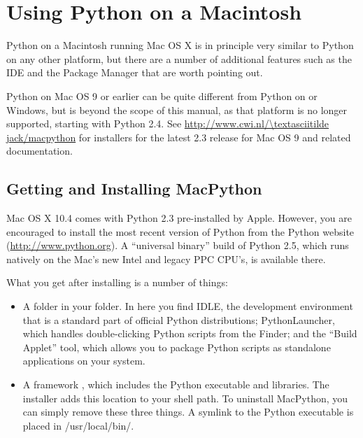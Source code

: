 \chapter{Using Python on a Macintosh \label{using}}

Python on a Macintosh running Mac OS X is in principle very similar to
Python on any other \UNIX{} platform, but there are a number of additional
features such as the IDE and the Package Manager that are worth pointing out.

Python on Mac OS 9 or earlier can be quite different from Python on
\UNIX{} or Windows, but is beyond the scope of this manual, as that platform
is no longer supported, starting with Python 2.4. See
\url{http://www.cwi.nl/\textasciitilde jack/macpython} for installers
for the latest 2.3 release for Mac OS 9 and related documentation.

\section{Getting and Installing MacPython \label{getting-OSX}}

Mac OS X 10.4 comes with Python 2.3 pre-installed by Apple. However, you are
encouraged to install the most recent version of Python from the Python website
(\url{http://www.python.org}). A ``universal binary'' build of Python 2.5, which
runs natively on the Mac's new Intel and legacy PPC CPU's, is available there.

What you get after installing is a number of things:

\begin{itemize}
\item A  folder in your  folder. In here
  you find IDLE, the development environment that is a standard part of official
  Python distributions; PythonLauncher, which handles double-clicking Python
  scripts from the Finder; and the ``Build Applet'' tool, which allows you to
  package Python scripts as standalone applications on your system.

\item A framework , which includes
  the Python executable and libraries. The installer adds this location to your
  shell path. To uninstall MacPython, you can simply remove these three
  things. A symlink to the Python executable is placed in /usr/local/bin/.
\end{itemize}

